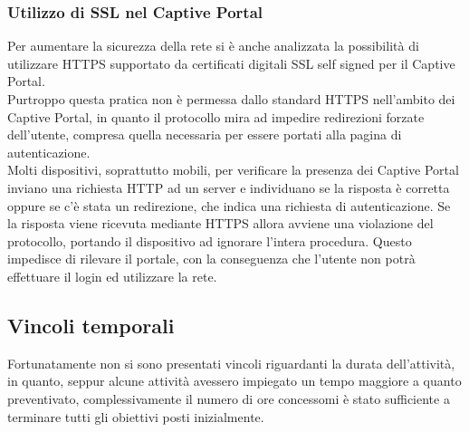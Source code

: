 \documentclass[Tesi.tex]{subfiles}
\begin{document}
\subsubsection{Utilizzo di SSL nel Captive Portal}
Per aumentare la sicurezza della rete si è anche analizzata la possibilità di utilizzare HTTPS supportato da certificati digitali SSL self signed per il Captive Portal. \\
Purtroppo questa pratica non è permessa dallo standard HTTPS nell'ambito dei Captive Portal, in quanto il protocollo mira ad impedire redirezioni forzate dell'utente, compresa quella necessaria per essere portati alla pagina di autenticazione. \\
Molti dispositivi, soprattutto mobili, per verificare la presenza dei Captive Portal inviano una richiesta HTTP ad un server e individuano se la risposta è corretta oppure se c'è stata un redirezione, che indica una richiesta di autenticazione. Se la risposta viene ricevuta mediante HTTPS allora avviene una violazione del protocollo, portando il dispositivo ad ignorare l'intera procedura. Questo impedisce di rilevare il portale, con la conseguenza che l'utente non potrà effettuare il login ed utilizzare la rete.

\subsection{Vincoli temporali}
Fortunatamente non si sono presentati vincoli riguardanti la durata dell'attività, in quanto, seppur alcune attività avessero impiegato un tempo maggiore a quanto preventivato, complessivamente il numero di ore concessomi è stato sufficiente a terminare tutti gli obiettivi posti inizialmente.
\end{document}
